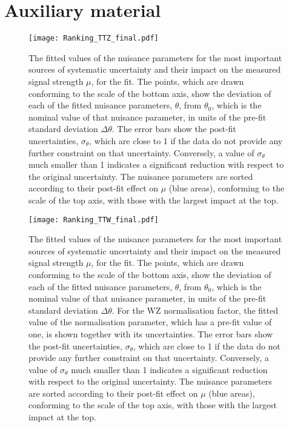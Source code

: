 \part*{Auxiliary material}

\begin{figure}[hb!]
\texttt{[image: Ranking\_TTZ\_final.pdf]}                
\caption{\label{fig:ranking_ttZData} The fitted values of the nuisance
parameters for the most important sources of systematic uncertainty and their
impact on the measured signal strength $\mu$, for the \ttZ fit. The points, which are
drawn conforming to the scale of the bottom axis, show the deviation of each of
the fitted nuisance parameters, $\theta$, from $\theta_0$, which is the nominal
value of that nuisance parameter, in units of the pre-fit standard deviation
$\Delta\theta$. The error bars show the post-fit uncertainties,
$\sigma_\theta$, which are close to 1 if the data do not provide any further
constraint on that uncertainty. Conversely, a value of $\sigma_\theta$ much
smaller than 1 indicates a significant reduction with respect to the original
uncertainty. The nuisance parameters are sorted according to their post-fit
effect on $\mu$ (blue areas), conforming to the scale of the top axis, with
those with the largest impact at the top. }
\end{figure}

\begin{figure}
\texttt{[image: Ranking\_TTW\_final.pdf]}                
\caption{\label{fig:ranking_ttWData} 
The fitted values of the nuisance parameters for the most important sources of
systematic uncertainty and their impact on the measured signal strength $\mu$, for
the \ttW fit. The points, which are drawn conforming to the scale of the bottom
axis, show the deviation of each of the fitted nuisance parameters, $\theta$,
from $\theta_0$, which is the nominal value of that nuisance parameter, in
units of the pre-fit standard deviation $\Delta\theta$.  For the WZ
normalisation factor, the fitted value of the normalisation parameter, which has
a pre-fit value of one, is shown together with its uncertainties.  The error
bars show the post-fit uncertainties, $\sigma_\theta$, which are close to 1 if
the data do not provide any further constraint on that uncertainty. Conversely,
a value of $\sigma_\theta$ much smaller than 1 indicates a significant
reduction with respect to the original uncertainty. The nuisance parameters are
sorted according to their post-fit effect on $\mu$ (blue areas), conforming to
the scale of the top axis, with those with the largest impact at the top.}
\end{figure}

